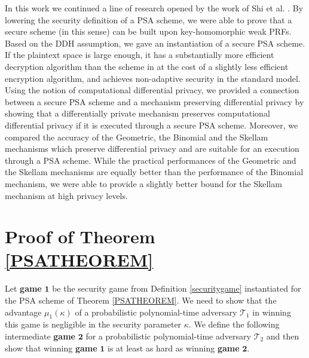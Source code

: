 \documentclass[10pt]{extarticle}
\begin{document}
In this work we continued a line of research opened by the work of Shi et al. \cite{2}. By lowering the security definition of a PSA scheme, we were able to prove that a secure scheme (in this sense) can be built upon key-homomorphic weak PRFs. Based on the DDH assumption, we gave an instantiation of a secure PSA scheme. If the plaintext space is large enough, it has a substantially more efficient decryption algorithm than the scheme in \cite{2} at the cost of a slightly less efficient encryption algorithm, and achieves non-adaptive security in the standard model. Using the notion of computational differential privacy, we provided a connection between a secure PSA scheme and a mechanism preserving differential privacy by showing that a differentially private mechanism preserves computational differential privacy if it is executed through a secure PSA scheme. Moreover, we compared the accuracy of the Geometric, the Binomial and the Skellam mechanisms which preserve differential privacy and are suitable for an execution through a PSA scheme. While the practical performances of the Geometric and the Skellam mechanisms are equally better than the performance of the Binomial mechanism, we were able to provide a slightly better bound for the Skellam mechanism at high privacy levels.


\appendix








\section{Proof of Theorem \ref{PSATHEOREM}}\label{ptproof}

Let \textbf{game} $\boldsymbol 1$ be the security game from Definition \ref{securitygame} instantiated for the PSA scheme of Theorem \ref{PSATHEOREM}. We need to show that the advantage $\mu_{1}(\kappa)$ of a probabilistic polynomial-time adversary $\mathcal{T}_1$ in winning this game is negligible in the security parameter $\kappa$. We define the following intermediate \textbf{game} $\boldsymbol 2$ for a probabilistic polynomial-time adversary $\mathcal{T}_2$ and then show that winning \textbf{game} $\boldsymbol 1$ is at least as hard as winning \textbf{game} $\boldsymbol 2$.\\
\end{document}
